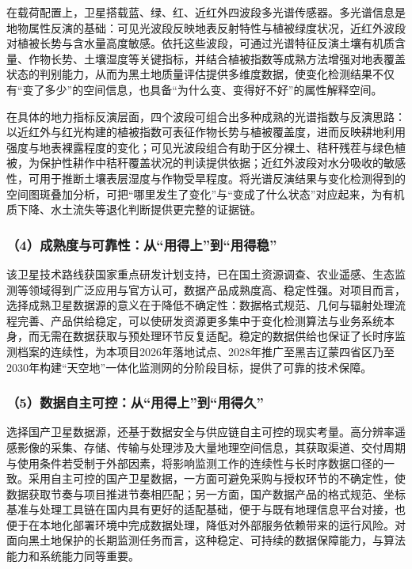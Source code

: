 \documentclass[12pt, a4paper]{ctexart}
\begin{document}
在载荷配置上，卫星搭载蓝、绿、红、近红外四波段多光谱传感器。多光谱信息是地物属性反演的基础：可见光波段反映地表反射特性与植被绿度状况，近红外波段对植被长势与含水量高度敏感。依托这些波段，可通过光谱特征反演土壤有机质含量、作物长势、土壤湿度等关键指标，并结合植被指数等成熟方法增强对地表覆盖状态的判别能力，从而为黑土地质量评估提供多维度数据，使变化检测结果不仅有“变了多少”的空间信息，也具备“为什么变、变得好不好”的属性解释空间。

在具体的地力指标反演层面，四个波段可组合出多种成熟的光谱指数与反演思路：以近红外与红光构建的植被指数可表征作物长势与植被覆盖度，进而反映耕地利用强度与地表裸露程度的变化；可见光波段组合有助于区分裸土、秸秆残茬与绿色植被，为保护性耕作中秸秆覆盖状况的判读提供依据；近红外波段对水分吸收的敏感性，可用于推断土壤表层湿度与作物受旱程度。将光谱反演结果与变化检测得到的空间图斑叠加分析，可把“哪里发生了变化”与“变成了什么状态”对应起来，为有机质下降、水土流失等退化判断提供更完整的证据链。

\subsubsection{（4）成熟度与可靠性：从“用得上”到“用得稳”}

该卫星技术路线获国家重点研发计划支持，已在国土资源调查、农业遥感、生态监测等领域得到广泛应用与官方认可，数据产品成熟度高、稳定性强。对项目而言，选择成熟卫星数据源的意义在于降低不确定性：数据格式规范、几何与辐射处理流程完善、产品供给稳定，可以使研发资源更多集中于变化检测算法与业务系统本身，而无需在数据获取与预处理环节反复适配。稳定的数据供给也保证了长时序监测档案的连续性，为本项目2026年落地试点、2028年推广至黑吉辽蒙四省区乃至2030年构建“天空地”一体化监测网的分阶段目标，提供了可靠的技术保障。

\subsubsection{（5）数据自主可控：从“用得上”到“用得久”}

选择国产卫星数据源，还基于数据安全与供应链自主可控的现实考量。高分辨率遥感影像的采集、存储、传输与处理涉及大量地理空间信息，其获取渠道、交付周期与使用条件若受制于外部因素，将影响监测工作的连续性与长时序数据口径的一致。采用自主可控的国产卫星数据，一方面可避免采购与授权环节的不确定性，使数据获取节奏与项目推进节奏相匹配；另一方面，国产数据产品的格式规范、坐标基准与处理工具链在国内具有更好的适配基础，便于与既有地理信息平台对接，也便于在本地化部署环境中完成数据处理，降低对外部服务依赖带来的运行风险。对面向黑土地保护的长期监测任务而言，这种稳定、可持续的数据保障能力，与算法能力和系统能力同等重要。
\end{document}
